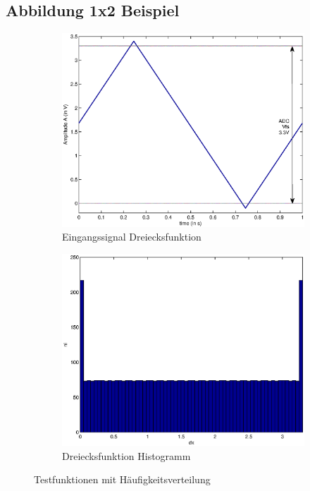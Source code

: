 \documentclass[SSS_Laborbericht.tex]{subfiles}
\begin{document}
\subsection{Abbildung 1x2 Beispiel}
\begin{figure}[H]
	\begin{subfigure}{.499\textwidth}
		\centering\small
		\includegraphics[width=\textwidth]{media/matlab/HISTOGRAM/ramp_fkt_samples_5000.eps}
		\caption{Eingangssignal Dreiecksfunktion}
		\label{fig:GRUNDL_RAMP_RAMP_1X2}
	\end{subfigure}
	\begin{subfigure}{.499\textwidth}
		\centering\small
		\includegraphics[width=\textwidth]{media/matlab/HISTOGRAM/ramp_hist_samples_5000.eps}
		\caption{Dreiecksfunktion Histogramm}
		\label{fig:GRUNDL_RAMP_HIST_1X2}
	\end{subfigure}
\caption{Testfunktionen mit Häufigkeitsverteilung}
\label{fig:GRUNDL_RAMP_SIN_HIST_1X2}
\end{figure}
\end{document}
